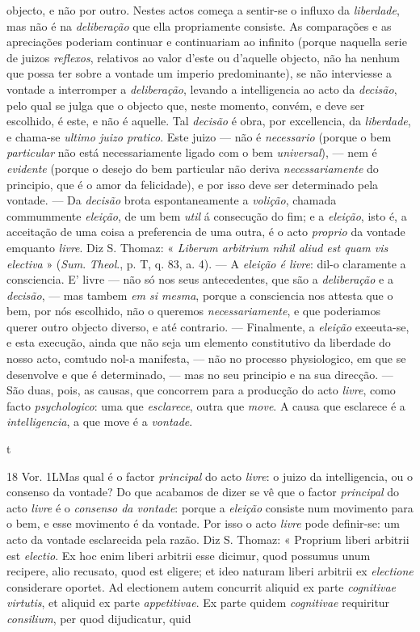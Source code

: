 objecto, e não por outro. Nestes actos começa a sentir-se o influxo da \emph{liberdade}, mas não é na \emph{deliberação} que ella propriamente consiste. As comparações e as apreciações poderiam continuar e continuariam ao infinito (porque naquella serie de juizos \emph{reflexos}, relativos ao valor d'este ou d'aquelle objecto, não ha nenhum que possa ter sobre a vontade um imperio predominante), se não interviesse a vontade a interromper a \emph{deliberação}, levando a intelligencia ao acto da \emph{decisão}, pelo qual se julga que o objecto que, neste momento, convém, e deve ser escolhido, é este, e não é aquelle. Tal \emph{decisão} é obra, por excellencia, da \emph{liberdade}, e chama-se \emph{ultimo juizo pratico}. Este juizo --- não é \emph{necessario} (porque o bem \emph{particular} não está necessariamente ligado com o bem \emph{universal}), --- nem é \emph{evidente} (porque o desejo do bem particular não deriva \emph{necessariamente} do principio, que é o amor da felicidade), e por isso deve ser determinado pela vontade. --- Da \emph{decisão} brota espontaneamente a \emph{volição}, chamada commummente \emph{eleição}, de um bem \emph{util} á consecução do fim; e a \emph{eleição}, isto é, a acceitação de uma coisa a preferencia de uma outra, é o acto \emph{proprio} da vontade emquanto \emph{livre}. Diz S. Thomaz: « \emph{Liberum arbitrium nihil aliud est quam vis electiva} » (\emph{Sum}. \emph{Theol}., p. T, q. 83, a. 4). --- A \emph{eleição é livre}: dil-o claramente a consciencia. E' livre --- não só nos seus antecedentes, que são a \emph{deliberação} e a \emph{decisão}, --- mas tambem \emph{em si mesma}, porque a consciencia nos attesta que o bem, por nós escolhido, não o queremos \emph{necessariamente}, e que poderiamos querer outro objecto diverso, e até contrario. --- Finalmente, a \emph{eleição} exeeuta-se, e esta execução, ainda que não seja um elemento constitutivo da liberdade do nosso acto, comtudo nol-a manifesta, --- não no processo physiologico, em que se desenvolve e que é determinado, --- mas no seu principio e na sua direcção. --- São duas, pois, as causas, que concorrem para a producção do acto \emph{livre}, como facto \emph{psychologico}: uma que \emph{esclarece}, outra que \emph{move}. A causa que esclarece é a \emph{intelligencia}, a que move é a \emph{vontade}.\par t\par 18 Vor. 1LMas qual é o factor \emph{principal} do acto \emph{livre}: o juizo da intelligencia, ou o consenso da vontade? Do que acabamos de dizer se vê que o factor \emph{principal} do acto \emph{livre} é o \emph{consenso da vontade}: porque a \emph{eleição} consiste num movimento para o bem, e esse movimento é da vontade. Por isso o acto \emph{livre} pode definir-se: um acto da vontade esclarecida pela razão. Diz S. Thomaz: « Proprium liberi arbitrii est \emph{electio}. Ex hoc enim liberi arbitrii esse dicimur, quod possumus unum recipere, alio recusato, quod est eligere; et ideo naturam liberi arbitrii ex \emph{electione} considerare oportet. Ad electionem autem concurrit aliquid ex parte \emph{cognitivae virtutis}, et aliquid ex parte \emph{appetitivae}. Ex parte quidem \emph{cognitivae} requiritur \emph{consilium}, per quod dijudicatur, quid 